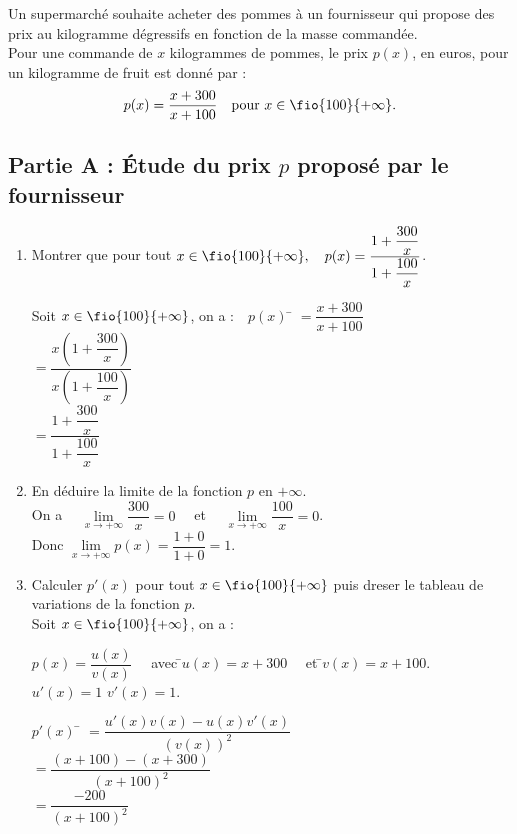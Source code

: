 \documentclass[a4paper,11pt,exos]{nsi} %
\begin{document}
\exo{}
\textcolor{UGLiBlue}{Un supermarché souhaite acheter des pommes à un fournisseur qui propose des prix au kilogramme dégressifs en fonction de la masse commandée.\\
Pour une commande de $x$ kilogrammes de pommes, le prix $p(x)$, en euros, pour un kilogramme de fruit est donné par :
$$ p(x)=\dfrac{x+300}{x+100}\quad \text{pour }x\in\fio{100}{+\infty}.$$}
\subsection*{Partie A : Étude du prix $p$ proposé par le fournisseur}
\begin{enumerate}
    \item \textcolor{UGLiBlue}{Montrer que pour tout $x\in\fio{100}{+\infty}, \quad p(x)=\dfrac{1+\dfrac{300}{x}}{1+\dfrac{100}{x}}$.}
    \begin{tabbing}
         Soit $x\in\fio{100}{+\infty}$, on a :$\quad p(x)$ \= $=\dfrac{x+300}{x+100}$\\[.5em]
        \> $=\dfrac{x\left(1+\dfrac{300}{x}\right)}{x\left(1+\dfrac{100}{x}\right)}$\\[.5em]
        \> $=\dfrac{1+\dfrac{300}{x}}{1+\dfrac{100}{x}}$
    \end{tabbing}
    \item \textcolor{UGLiBlue}{En déduire la limite de la fonction $p$ en $+\infty$.}\\[.5em]
    On a $\quad\lim\limits_{x\to+\infty}\dfrac{300}{x}=0\quad$ et $\quad\lim\limits_{x\to+\infty}\dfrac{100}{x}=0$.\\
    Donc $\lim\limits_{x\to+\infty}p(x)=\dfrac{1+0}{1+0}=1$.
    \item \textcolor{UGLiBlue}{Calculer $p'(x)$ pour tout $x\in\fio{100}{+\infty}$ puis dreser le tableau de variations de la fonction $p$.}\\[.5em]
    Soit $x\in\fio{100}{+\infty}$, on a :
    \begin{tabbing}
        $p(x)=\dfrac{u(x)}{v(x)}\quad$ avec \quad \=$u(x)=x+300\quad$ et \quad \=$v(x)=x+100$.\\
        \>  $u'(x)=1$ \> $v'(x)=1$.
    \end{tabbing}
    \begin{tabbing}
        $p'(x)$ \= $=\dfrac{u'(x)v(x)-u(x)v'(x)}{\left(v(x)\right)^2}$\\[.5em]
        \> $=\dfrac{(x+100)-(x+300)}{(x+100)^2}$\\[.5em]
        \> $=\dfrac{-200}{(x+100)^2}$
    \end{tabbing}

\end{enumerate}
\end{document}
